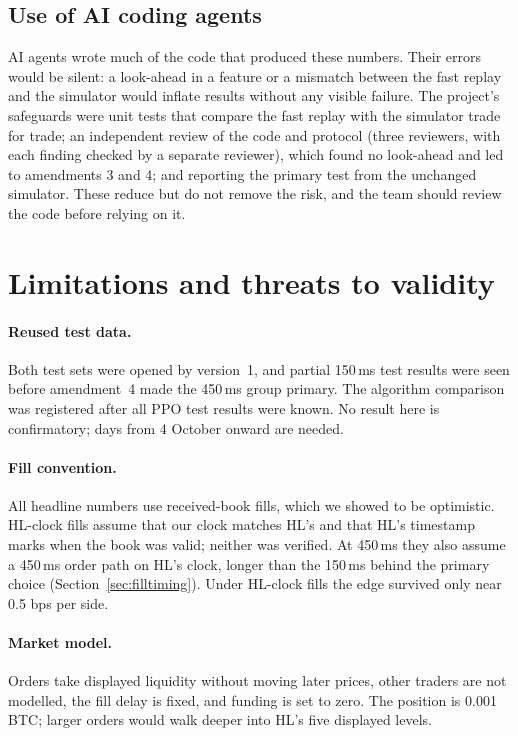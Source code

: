 \documentclass[12pt,a4paper]{article}
\DeclareRobustCommand{\bps}{\ifmmode\,\text{bps}\else\,bps\fi}
\begin{document}
\subsection{Use of AI coding agents}
AI agents wrote much of the code that produced these numbers. Their errors would be silent: a
look-ahead in a feature or a mismatch between the fast replay and the simulator would inflate
results without any visible failure. The project's safeguards were unit tests that compare the
fast replay with the simulator trade for trade; an independent review of the code and
protocol (three reviewers, with each finding checked by a separate reviewer), which found no
look-ahead and led to amendments 3 and 4; and reporting the primary test from the unchanged
simulator. These reduce but do not remove the risk, and the team should review the code before
relying on it.

\section{Limitations and threats to validity}\label{sec:limits}

\paragraph{Reused test data.} Both test sets were opened by version~1, and partial 150\,ms test
results were seen before amendment~4 made the 450\,ms group primary. The algorithm comparison
was registered after all PPO test results were known. No result here is confirmatory; days from
4 October onward are needed.

\paragraph{Fill convention.} All headline numbers use received-book fills, which we showed to be
optimistic. HL-clock fills assume that our clock matches HL's and that HL's timestamp marks when
the book was valid; neither was verified. At 450\,ms they also assume a 450\,ms order path on
HL's clock, longer than the 150\,ms behind the primary choice (Section~\ref{sec:filltiming}).
Under HL-clock fills the edge survived only near 0.5\bps{} per side.

\paragraph{Market model.} Orders take displayed liquidity without moving later prices, other traders
are not modelled, the fill delay is fixed, and funding is set to zero. The position is
0.001\,BTC; larger orders would walk deeper into HL's five displayed levels.
\end{document}

